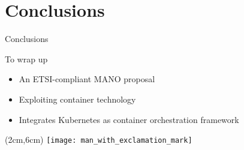 \section{Conclusions}
\begin{frame}{Conclusions}

  To wrap up
  \begin{itemize}
  \item<1-> An ETSI-compliant MANO proposal
  \item<2-> Exploiting container technology
  \item<3-> Integrates Kubernetes as container orchestration framework
  \end{itemize}

  \begin{textblock*}{5cm}(2cm,6cm)
    \texttt{[image: man\_with\_exclamation\_mark]}
  \end{textblock*}
\end{frame}
